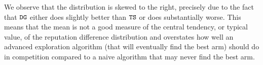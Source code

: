 \documentclass[../competing_bandits.tex]{subfiles}
\begin{document}
We observe that the distribution is skewed to the right, precisely due to the fact that $\mathtt{DG}$ either does slightly better than $\mathtt{TS}$ or does substantially worse. This means that the mean is not a good measure of the central tendency, or typical value, of the reputation difference distribution and overstates how well an advanced exploration algorithm (that will eventually find the best arm) should do in competition compared to a naive algorithm that may never find the best arm.
\end{document}
